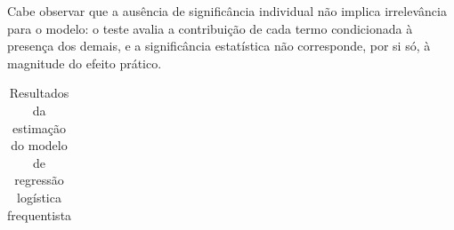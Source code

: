 \documentclass[
  brazilian,
  12pt,
  letterpaper,
  DIV=11,
  numbers=noendperiod]{scrartcl}
\begin{document}
Cabe observar que a ausência de significância individual não implica
irrelevância para o modelo: o teste avalia a contribuição de cada termo
condicionada à presença dos demais, e a significância estatística não
corresponde, por si só, à magnitude do efeito prático.

{

\begin{longtable}[]{@{}
  >{\raggedright\arraybackslash}p{}
  >{\raggedleft\arraybackslash}p{}
  >{\raggedleft\arraybackslash}p{}
  >{\raggedleft\arraybackslash}p{}
  >{\raggedleft\arraybackslash}p{}
  >{\raggedleft\arraybackslash}p{}@{}}

\caption{\label{tbl-complete-model-default}Resultados da estimação do
modelo de regressão logística frequentista}

\tabularnewline


\end{longtable}}
\end{document}

